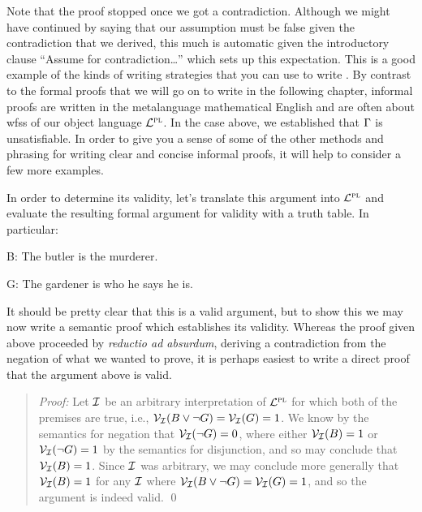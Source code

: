 Note that the proof stopped once we got a contradiction.
Although we might have continued by saying that our assumption must be false given the contradiction that we derived, this much is automatic given the introductory clause ``Assume for contradiction\ldots'' which sets up this expectation.
This is a good example of the kinds of writing strategies that you can use to write .
By contrast to the formal proofs that we will go on to write in the following chapter, informal proofs are written in the metalanguage mathematical English and are often about wfss of our object language $\mathcal{L}^{\textsc{pl}}$.
In the case above, we established that $\Gamma$ is unsatisfiable. 
In order to give you a sense of some of the other methods and phrasing for writing clear and concise informal proofs, it will help to consider a few more examples.


\begin{earg}
\end{earg}

In order to determine its validity, let's translate this argument into $\mathcal{L}^{\textsc{pl}}$ and evaluate the resulting formal argument for validity with a truth table.
In particular:

\begin{ekey}
  \item[B:] The butler is the murderer.
  \item[G:] The gardener is who he says he is.
\end{ekey}

\begin{earg}
\end{earg}

It should be pretty clear that this is a valid argument, but to show this we may now write a semantic proof which establishes its validity.
Whereas the proof given above proceeded by \textit{reductio ad absurdum}, deriving a contradiction from the negation of what we wanted to prove, it is perhaps easiest to write a direct proof that the argument above is valid.

\begin{quote} 
  \textit{Proof:}
  Let $\mathcal{I}$ be an arbitrary interpretation of $\mathcal{L}^{\textsc{pl}}$ for which both of the premises are true, i.e., $\mathcal{V}_{\mathcal{I}}(B \vee \neg G) = \mathcal{V}_{\mathcal{I}}(G) = 1$. 
  We know by the semantics for negation that $\mathcal{V}_{\mathcal{I}}(\neg G) = 0$, where either $\mathcal{V}_{\mathcal{I}}(B) = 1$ or $\mathcal{V}_{\mathcal{I}}(\neg G) = 1$ by the semantics for disjunction, and so may conclude that $\mathcal{V}_{\mathcal{I}}(B) = 1$.
  Since $\mathcal{I}$ was arbitrary, we may conclude more generally that $\mathcal{V}_{\mathcal{I}}(B) = 1$ for any $\mathcal{I}$ where $\mathcal{V}_{\mathcal{I}}(B \vee \neg G) = \mathcal{V}_{\mathcal{I}}(G) = 1$, and so the argument is indeed valid.
  \qed
\end{quote}

